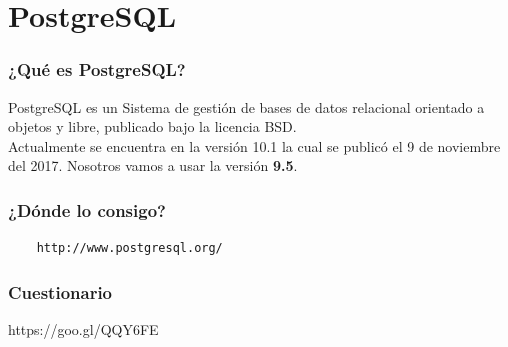 \documentclass{beamer}
\begin{document}
\section{PostgreSQL}

\begin{frame}
  \frametitle{¿Qué es PostgreSQL?}
  PostgreSQL es un Sistema de gestión de bases de datos relacional orientado a
  objetos y libre, publicado bajo la licencia BSD.\\
  Actualmente se encuentra en la versión 10.1 la cual se publicó el 9
  de noviembre del 2017. Nosotros vamos a usar la versión \textbf{9.5}.
\end{frame}

\begin{frame}[fragile]
  \frametitle{¿Dónde lo consigo?}
  \begin{verbatim}
    http://www.postgresql.org/
  \end{verbatim}
\end{frame}

\begin{frame}
  \frametitle{Cuestionario}
  https://goo.gl/QQY6FE
\end{frame}
\end{document}
